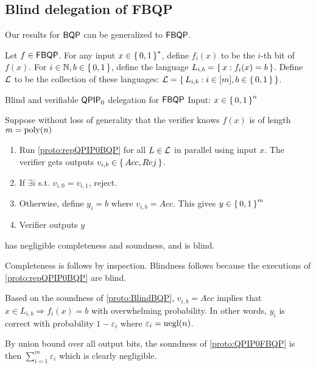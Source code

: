 \subsection{Blind delegation of FBQP}


Our results for $\operatorname{\mathsf{BQP}}$ can be generalized to $\operatorname{\mathsf{FBQP}}$.

Let $f\in\operatorname{\mathsf{FBQP}}$.
For any input $x\in\set{0, 1}^*$, define $f_i(x)$ to be the $i$-th bit of $f(x)$.
For $i\in\mathbb{N}, b\in\set{0,1}$, define the language $L_{i, b}=\set{x:f_i(x)=b}$.
Define ${\cal L}$ to be the collection of these languages: ${\cal L} = \set{L_{i, b}: i\in[m], b\in\set{0, 1}}$.

\begin{protocol}{Blind and verifiable $\operatorname{\mathsf{QPIP}}_0$ delegation for $\operatorname{\mathsf{FBQP}}$}
	\label{proto:QPIP0FBQP}
	Input: $x\in\set{0, 1}^n$

	Suppose without loss of generality that the verifier knows $f(x)$ is of length $m=\operatorname*{\operatorname{poly}}(n)$ 
	\begin{enumerate}
		\item Run \cref{proto:repQPIP0BQP} for all $L\in{\cal L}$ in parallel using input $x$. The verifier gets outputs $v_{i, b}\in\set{Acc, Rej}$.
		\item If $\exists i$ s.t. $v_{i,0}=v_{i,1}$, reject.
		\item Otherwise, define $y_i = b$ where $v_{i, b}=Acc$. This gives $y\in\set{0,1}^m$
		\item Verifier outputs $y$
	\end{enumerate}
\end{protocol}

\begin{theorem}
	 has negligible completeness and soundness, and is blind.
\end{theorem}
\begin{prf}
	Completeness is follows by inspection.
	Blindness follows because the executions of \cref{proto:repQPIP0BQP} are blind.

	Based on the soundness of \cref{proto:BlindBQP}, $v_{i, b}=Acc$ implies that $x\in L_{i, b}\Rightarrow f_i(x)=b$ with overwhelming probability.
	In other words, $y_i$ is correct with probability $1-\varepsilon_i$ where $\varepsilon_i=\operatorname{negl}(n)$. 
	
	By union bound over all output bits, the soundness of \cref{proto:QPIP0FBQP} is then
	$\sum_{i=1}^m \varepsilon_i$
	which is clearly negligible.
\end{prf}
